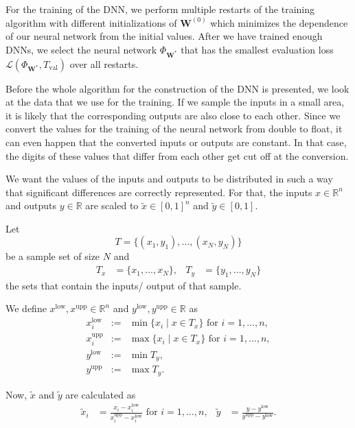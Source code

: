 For the training of the DNN, we perform multiple restarts of the training algorithm with different initializations of $\mathbf{W}^{(0)}$ which minimizes the dependence of our neural network from the initial values. After we have trained enough DNNs, we select the neural network $\Phi_{\mathbf{W}^*}$ that has the smallest evaluation loss $\mathscr{L}(\Phi_{\mathbf{W}^*},T_\mathrm{val})$ over all restarts.

Before the whole algorithm for the construction of the DNN is presented, we look at the data that we use for the training. If we sample the inputs in a small area, it is likely that the corresponding outputs are also close to each other. Since we convert the values for the training of the neural network from double to float, it can even happen that the converted inputs or outputs are constant. In that case, the digits of these values that differ from each other get cut off at the conversion.

We want the values of the inputs and outputs to be distributed in such a way that significant differences are correctly represented. For that, the inputs $x\in\mathbb{R}^n$ and outputs $y\in\mathbb{R}$ are scaled to $\tilde{x}\in[0,1]^n$ and $\tilde{y}\in[0,1]$.

Let
\begin{equation}
T=\{(x_1,y_1),\dotsc,(x_N,y_N)\}
\end{equation}
be a sample set of size $N$ and
\begin{align*}
T_x&=\{x_1,\dotsc,x_N\},&T_y&=\{y_1,\dotsc,y_N\}
\end{align*}
the sets that contain the inputs/ output of that sample.

We define $x^\mathrm{low}, x^\mathrm{upp}\in\mathbb{R}^n$ and $y^\mathrm{low}, y^\mathrm{upp}\in\mathbb{R}$ as
\begin{eqnarray*}
x^\mathrm{low}_i&:=&\operatorname*{min}\{x_i\mid x\in T_x\}\text{ for }i=1,\dotsc,n,\\
x^\mathrm{upp}_i&:=&\operatorname*{max}\{x_i\mid x\in T_x\}\text{ for }i=1,\dotsc,n,\\
y^\mathrm{low}&:=&\operatorname*{min}T_y,\\
y^\mathrm{upp}&:=&\operatorname*{max}T_y.
\end{eqnarray*}

Now, $\tilde{x}$ and $\tilde{y}$ are calculated as
\begin{align*}
\tilde{x}_i&=\frac{x_i-x^\mathrm{low}_i}{x^\mathrm{upp}_i-x^\mathrm{low}_i}\text{ for }i=1,\dotsc,n,&\tilde{y}&=\frac{y-y^\mathrm{low}}{y^\mathrm{upp}-y^\mathrm{low}}.
\end{align*}

